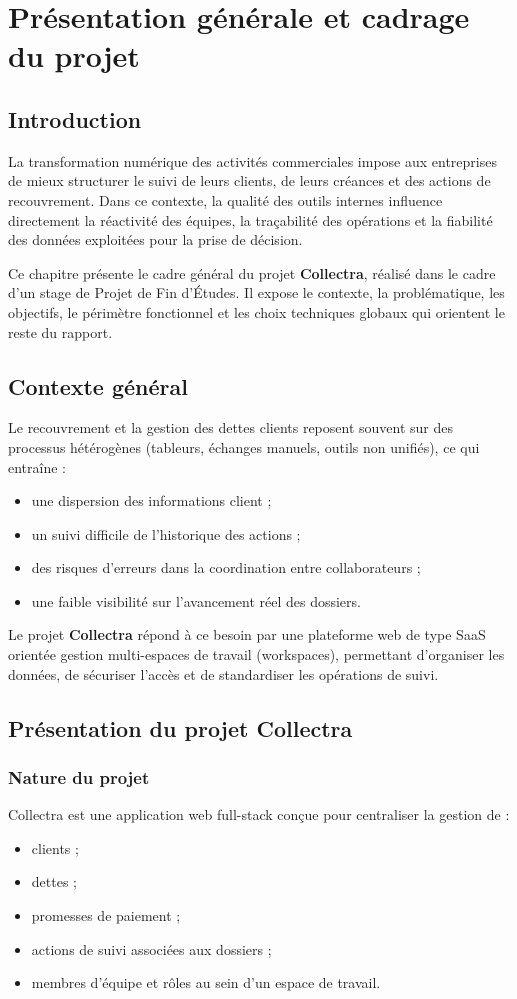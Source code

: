\chapter{Présentation générale et cadrage du projet}
\label{chap:generalites}

\section*{Introduction}
La transformation numérique des activités commerciales impose aux entreprises de mieux structurer le suivi de leurs clients, de leurs créances et des actions de recouvrement. Dans ce contexte, la qualité des outils internes influence directement la réactivité des équipes, la traçabilité des opérations et la fiabilité des données exploitées pour la prise de décision.

Ce chapitre présente le cadre général du projet \textbf{Collectra}, réalisé dans le cadre d'un stage de Projet de Fin d'Études. Il expose le contexte, la problématique, les objectifs, le périmètre fonctionnel et les choix techniques globaux qui orientent le reste du rapport.

\section{Contexte général}
Le recouvrement et la gestion des dettes clients reposent souvent sur des processus hétérogènes (tableurs, échanges manuels, outils non unifiés), ce qui entraîne :
\begin{itemize}
  \item une dispersion des informations client ;
  \item un suivi difficile de l'historique des actions ;
  \item des risques d'erreurs dans la coordination entre collaborateurs ;
  \item une faible visibilité sur l'avancement réel des dossiers.
\end{itemize}

Le projet \textbf{Collectra} répond à ce besoin par une plateforme web de type SaaS orientée gestion multi-espaces de travail (workspaces), permettant d'organiser les données, de sécuriser l'accès et de standardiser les opérations de suivi.

\section{Présentation du projet Collectra}
\subsection{Nature du projet}
Collectra est une application web full-stack conçue pour centraliser la gestion de :
\begin{itemize}
  \item clients ;
  \item dettes ;
  \item promesses de paiement ;
  \item actions de suivi associées aux dossiers ;
  \item membres d'équipe et rôles au sein d'un espace de travail.
\end{itemize}

